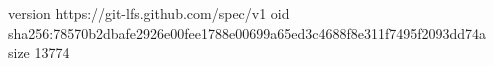 version https://git-lfs.github.com/spec/v1
oid sha256:78570b2dbafe2926e00fee1788e00699a65ed3c4688f8e311f7495f2093dd74a
size 13774
